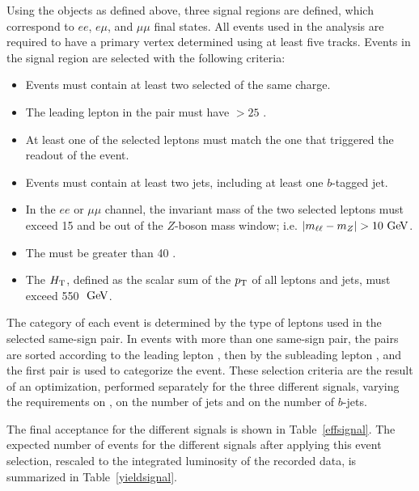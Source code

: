 Using the objects as defined above, three signal regions are defined, which correspond to $ee$, $e \mu$, and $\mu \mu$ final states.
All events used in the analysis are required to have a primary vertex determined using at least five tracks.
Events in the signal region are selected with the following criteria:
\begin{itemize}
\item Events must contain at least two selected of the same charge. 
\item The leading lepton in the pair must have \pT $>25$ \GeV{}.
\item At least one of the selected leptons must match the one that triggered the readout of the event.
\item Events must contain at least two jets, including at least one $b$-tagged jet.
\item In the $ee$ or $\mu\mu$ channel, the invariant mass of the two selected leptons must exceed 15 \GeV{} and be out of the $Z$-boson mass window; i.e. $|m_{\ell\ell} - m_Z| > 10 \GeV$.
\item The \met{} must be greater than 40 \GeV{}.
\item The $H_{\mathrm{T}}{}$, defined as the scalar sum of the $p_{\mathrm{T}}$ of all leptons and jets, must exceed 550 $\GeV{}$.
\end{itemize}
The category of each event is determined by the type of leptons used in the selected same-sign pair.
In events with more than one same-sign pair, the pairs are sorted according to the leading lepton \pT, then by the subleading lepton \pT, and the first pair is used to categorize the event.
These selection criteria are the result of an optimization, performed separately for the three different signals, varying the requirements on \HT{}, on the number of jets and on the number of $b$-jets.

The final acceptance for the different signals is shown in Table~\ref{effsignal}.
The expected number of events for the different signals after applying this event selection, rescaled to the integrated luminosity of the recorded data, is summarized in Table~\ref{yieldsignal}.

